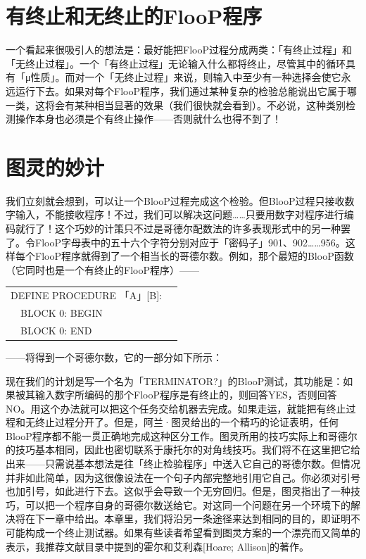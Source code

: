 \documentclass[
  12pt,
  twoside,
  openright,
  oldfontcommands,
]{memoir}
\begin{document}
\section{有终止和无终止的FlooP程序}

一个看起来很吸引人的想法是：最好能把FlooP过程分成两类：「有终止过程」和「无终止过程」。一个「有终止过程」无论输入什么都将终止，尽管其中的循环具有「μ性质」。而对一个「无终止过程」来说，则输入中至少有一种选择会使它永远运行下去。如果对每个FlooP程序，我们通过某种复杂的检验总能说出它属于哪一类，这将会有某种相当显著的效果（我们很快就会看到）。不必说，这种类别检测操作本身也必须是个有终止操作------否则就什么也得不到了！

\section{图灵的妙计}

我们立刻就会想到，可以让一个BlooP过程完成这个检验。但BlooP过程只接收数字输入，不能接收程序！不过，我们可以解决这问题\ldots\ldots 只要用数字对程序进行编码就行了！这个巧妙的计策只不过是哥德尔配数法的许多表现形式中的另一种罢了。令FlooP字母表中的五十六个字符分别对应于「密码子」901、902\ldots\ldots956。这样每个FlooP程序就得到了一个相当长的哥德尔数。例如，那个最短的BlooP函数（它同时也是一个有终止的FlooP程序）------

\begin{longtable}[]{>{\raggedright\arraybackslash}p{0.94\linewidth}}
\toprule\noalign{}
\endhead
\bottomrule\noalign{}
\endlastfoot
DEFINE PROCEDURE 「A」{[}B{]}: \\
　BLOCK 0: BEGIN \\
　BLOCK 0: END \\
\end{longtable}

------将得到一个哥德尔数，它的一部分如下所示：


现在我们的计划是写一个名为「TERMINATOR?」的BlooP测试，其功能是：如果被其输入数字所编码的那个FlooP程序是有终止的，则回答YES，否则回答NO。用这个办法就可以把这个任务交给机器去完成。如果走运，就能把有终止过程和无终止过程分开了。但是，阿兰·图灵给出的一个精巧的论证表明，任何BlooP程序都不能一贯正确地完成这种区分工作。图灵所用的技巧实际上和哥德尔的技巧基本相同，因此也密切联系于康托尔的对角线技巧。我们将不在这里把它给出来------只需说基本想法是往「终止检验程序」中送入它自己的哥德尔数。但情况并非如此简单，因为这很像设法在一个句子内部完整地引用它自己。你必须对引号也加引号，如此进行下去。这似乎会导致一个无穷回归。但是，图灵指出了一种技巧，可以把一个程序自身的哥德尔数送给它。对这同一个问题在另一个环境下的解决将在下一章中给出。本章里，我们将沿另一条途径来达到相同的目的，即证明不可能构成一个终止测试器。如果有些读者希望看到图灵方案的一个漂亮而又简单的表示，我推荐文献目录中提到的霍尔和艾利森{[}Hoare;
Allison{]}的著作。
\end{document}
